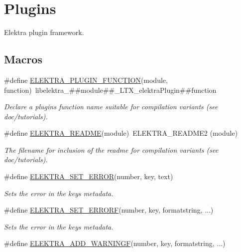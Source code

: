\hypertarget{group__plugin}{}\section{Plugins}
\label{group__plugin}


Elektra plugin framework.  


\subsection*{Macros}
\begin{DoxyCompactItemize}
\item 
\#define \hyperlink{group__plugin_ga34d1a66f0a6e89cfd20f4014a9975a2a}{E\+L\+E\+K\+T\+R\+A\+\_\+\+P\+L\+U\+G\+I\+N\+\_\+\+F\+U\+N\+C\+T\+I\+ON}(module,  function)~libelektra\+\_\+\#\#module\#\#\+\_\+\+L\+T\+X\+\_\+elektra\+Plugin\#\#function
\begin{DoxyCompactList}\small\item\em Declare a plugin\textquotesingle{}s function name suitable for compilation variants (see doc/tutorials). \end{DoxyCompactList}\item 
\#define \hyperlink{group__plugin_ga78d616f68bf9fb0942f66478597467c6}{E\+L\+E\+K\+T\+R\+A\+\_\+\+R\+E\+A\+D\+ME}(module)~E\+L\+E\+K\+T\+R\+A\+\_\+\+R\+E\+A\+D\+M\+E2 (module)
\begin{DoxyCompactList}\small\item\em The filename for inclusion of the readme for compilation variants (see doc/tutorials). \end{DoxyCompactList}\item 
\#define \hyperlink{group__plugin_gaab1842b82272e6d4235b6a71587a64d9}{E\+L\+E\+K\+T\+R\+A\+\_\+\+S\+E\+T\+\_\+\+E\+R\+R\+OR}(number,  key,  text)
\begin{DoxyCompactList}\small\item\em Sets the error in the keys metadata. \end{DoxyCompactList}\item 
\#define \hyperlink{group__plugin_ga3e4fc2c20d8e64bed7a54bb1af882e34}{E\+L\+E\+K\+T\+R\+A\+\_\+\+S\+E\+T\+\_\+\+E\+R\+R\+O\+RF}(number,  key,  formatstring, ...)
\begin{DoxyCompactList}\small\item\em Sets the error in the keys metadata. \end{DoxyCompactList}\item 
\#define \hyperlink{group__plugin_ga2bbb3bc3a3bdaf5b34b52de81886a098}{E\+L\+E\+K\+T\+R\+A\+\_\+\+A\+D\+D\+\_\+\+W\+A\+R\+N\+I\+N\+GF}(number,  key,  formatstring, ...)

\end{DoxyCompactItemize}

